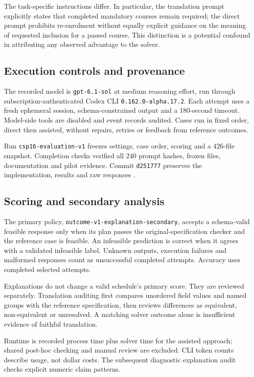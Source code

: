 \documentclass[11pt,a4paper]{article}
\newcommand{\code}[1]{\texttt{#1}}
\begin{document}
The task-specific instructions differ. In particular, the translation prompt
explicitly states that completed mandatory courses remain required; the
direct prompt prohibits re-enrolment without equally explicit guidance on
the meaning of requested inclusion for a passed course. This distinction is
a potential confound in attributing any observed advantage to the solver.

\subsection{Execution controls and provenance}
The recorded model is \code{gpt-6.1-sol} at medium reasoning effort, run
through subscription-authenticated Codex CLI \code{0.162.0-alpha.17.2}.
Each attempt uses a fresh ephemeral session, schema-constrained output
and a 180-second timeout. Model-side tools are disabled and event records
audited. Cases run in fixed order, direct then assisted, without repairs,
retries or feedback from reference outcomes.

Run \code{csp16-evaluation-v1} freezes settings, case order, scoring and a
426-file snapshot. Completion checks verified all 240 prompt hashes,
frozen files, documentation and pilot evidence. Commit \code{d251777}
preserves the implementation, results and raw responses \cite{repo}.

\subsection{Scoring and secondary analysis}
The primary policy, \code{outcome-v1-explanation-secondary}, accepts a
schema-valid feasible response only when its plan passes the original-specification
checker and the reference case is feasible. An infeasible prediction is
correct when it agrees with a validated infeasible label. Unknown outputs,
execution failures and malformed responses count as unsuccessful completed
attempts. Accuracy uses completed selected attempts.

Explanations do not change a valid schedule's primary score. They are
reviewed separately. Translation auditing first compares unordered field
values and named groups with the reference specification, then reviews
differences as equivalent, non-equivalent or unresolved. A matching solver
outcome alone is insufficient evidence of faithful translation.

Runtime is recorded process time plus solver time for the assisted approach;
shared post-hoc checking and manual review are excluded. CLI token counts
describe usage, not dollar costs. The subsequent diagnostic explanation audit
checks explicit numeric claim patterns.
\end{document}
